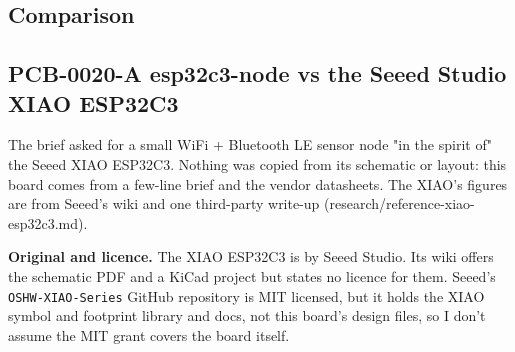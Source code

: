 \documentclass[11pt]{article}
\begin{document}
\subsection*{Comparison}
\subsection*{PCB-0020-A esp32c3-node vs the Seeed Studio XIAO ESP32C3}
The brief asked for a small WiFi + Bluetooth LE sensor node "in the spirit of" the Seeed XIAO ESP32C3. Nothing was copied from its schematic or layout: this board comes from a few-line brief and the vendor datasheets. The XIAO's figures are from Seeed's wiki and one third-party write-up (research/reference-xiao-esp32c3.md).

\textbf{Original and licence.} The XIAO ESP32C3 is by Seeed Studio. Its wiki offers the schematic PDF and a KiCad project but states no licence for them. Seeed's \texttt{OSHW-XIAO-Series} GitHub repository is MIT licensed, but it holds the XIAO symbol and footprint library and docs, not this board's design files, so I don't assume the MIT grant covers the board itself.
\end{document}
